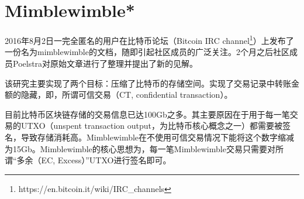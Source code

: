 \section{Mimblewimble*}
2016年8月2日一完全匿名的用户在比特币论坛（Bitcoin IRC channel\footnote{https://en.bitcoin.it/wiki/IRC\_channels}）上发布了一份名为mimblewimble的文档，随即引起社区成员的广泛关注。2个月之后社区成员Poelstra对原始文章进行了整理并提出了新的见解\cite{poelstra2016mimblewimble}。

该研究主要实现了两个目标：压缩了比特币的存储空间。实现了交易记录中转账金额的隐藏，即，所谓可信交易（CT, confidential transaction）。%

目前比特币区块链存储的交易信息已达100Gb之多。其主要原因在于用于每一笔交易的UTXO（unspent transaction output，为比特币核心概念之一）都需要被签名，导致存储消耗高。Mimblewimble在不使用可信交易情况下能将这个数字缩减为15Gb。Mimblewimble的核心思想为，每一笔Mimblewimble交易只需要对所谓“多余（EC, Excess）”UTXO进行签名即可。